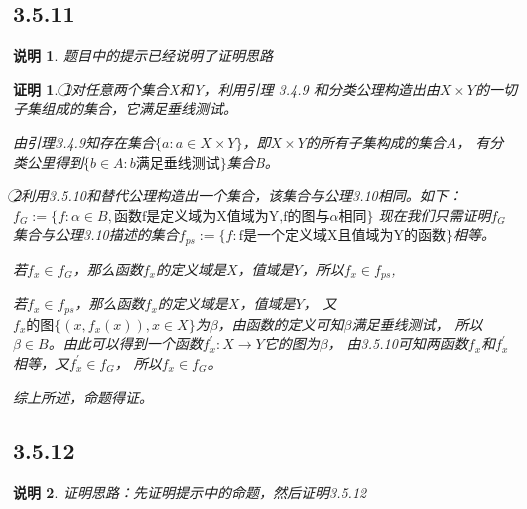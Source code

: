 \documentclass{article}
\theoremstyle{mystyle}
\newtheorem*{zremark}{说明}
\theoremstyle{zproofstyle}
\newtheorem*{zproof}{证明}
\begin{document}
\subsection*{3.5.11}
\begin{zgraytheorem}
  \begin{zremark}
    题目中的提示已经说明了证明思路
  \end{zremark}
\end{zgraytheorem}

\begin{zproof}
  \textcircled{1}对任意两个集合X和Y，利用引理 3.4.9 和分类公理构造出由$X \times Y$的一切子集组成的集合，它满足垂线测试。

  由引理3.4.9知存在集合$\{a : a \in X \times Y\}$，即$X\times Y$的所有子集构成的集合A，
  有分类公里得到$\{b \in A : b\text{满足垂线测试} \}$集合B。

  \textcircled{2}利用3.5.10和替代公理构造出一个集合，该集合与公理3.10相同。如下：
  \newline
  $f_G := \{f: \alpha \in B, \text{函数f是定义域为X值域为Y,f的图与}\alpha \text{相同}\}$
  \newline
  现在我们只需证明$f_G$集合与公理3.10描述的集合$f_{ps} := \{ f: \text{f是一个定义域X且值域为Y的函数}\}$相等。

  若$f_x \in f_G$，那么函数$f_x$的定义域是$X$，值域是$Y$，所以$f_x \in f_{ps}$,

  若$f_x \in f_{ps}$，那么函数$f_x$的定义域是$X$，值域是$Y$，
  又$f_x \text{的图}\{(x, f_x(x)), x \in X\}$为$\beta$，由函数的定义可知$\beta$满足垂线测试，
  所以$\beta \in B$。由此可以得到一个函数$f_x^\prime: X \rightarrow Y$它的图为$\beta$，
  由3.5.10可知两函数$f_x$和$f_x^\prime$相等，又$f_x^\prime \in f_G$，
  所以$f_x \in f_G$。

  综上所述，命题得证。
\end{zproof}

\subsection*{3.5.12}
\begin{zgraytheorem}
  \begin{zremark}
    证明思路：先证明提示中的命题，然后证明3.5.12
  \end{zremark}
\end{zgraytheorem}
\end{document}
